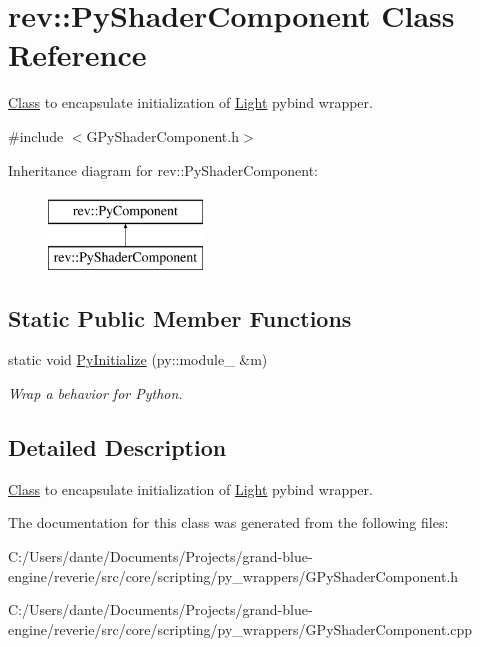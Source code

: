 \hypertarget{classrev_1_1_py_shader_component}{}\section{rev\+::Py\+Shader\+Component Class Reference}
\label{classrev_1_1_py_shader_component}


\mbox{\hyperlink{struct_class}{Class}} to encapsulate initialization of \mbox{\hyperlink{classrev_1_1_light}{Light}} pybind wrapper.  




{\ttfamily \#include $<$G\+Py\+Shader\+Component.\+h$>$}

Inheritance diagram for rev\+::Py\+Shader\+Component\+:\begin{figure}[H]
\begin{center}
\leavevmode
\includegraphics[height=2.000000cm]{classrev_1_1_py_shader_component}
\end{center}
\end{figure}
\subsection*{Static Public Member Functions}
\begin{DoxyCompactItemize}
\item 
\mbox{\label{classrev_1_1_py_shader_component_a3ed7dc87715123049360379ec783ff8c}} 
static void \mbox{\hyperlink{classrev_1_1_py_shader_component_a3ed7dc87715123049360379ec783ff8c}{Py\+Initialize}} (py\+::module\+\_\+ \&m)
\begin{DoxyCompactList}\small\item\em Wrap a behavior for Python. \end{DoxyCompactList}\end{DoxyCompactItemize}


\subsection{Detailed Description}
\mbox{\hyperlink{struct_class}{Class}} to encapsulate initialization of \mbox{\hyperlink{classrev_1_1_light}{Light}} pybind wrapper. 

The documentation for this class was generated from the following files\+:\begin{DoxyCompactItemize}
\item 
C\+:/\+Users/dante/\+Documents/\+Projects/grand-\/blue-\/engine/reverie/src/core/scripting/py\+\_\+wrappers/G\+Py\+Shader\+Component.\+h\item 
C\+:/\+Users/dante/\+Documents/\+Projects/grand-\/blue-\/engine/reverie/src/core/scripting/py\+\_\+wrappers/G\+Py\+Shader\+Component.\+cpp\end{DoxyCompactItemize}
